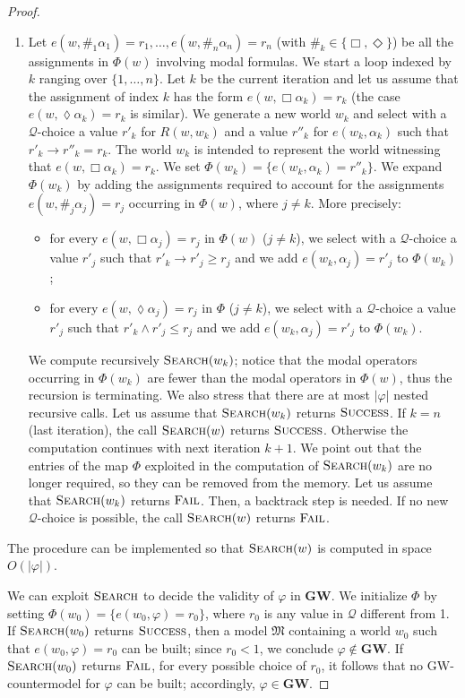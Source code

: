 \documentclass[copyright,creativecommons]{eptcs}
\newcommand{\GWL}{\mathbf{GW}}
\newcommand{\GWM}{\mbox{$\mathrm{GW}$}}
\newcommand{\Diam}{\lozenge}
\newcommand{\size}[1]{|#1|}
\newcommand{\M}{\mathfrak{M}}
\newcommand{\Search}{\textsc{Search}}
\newcommand{\Success}{\textsc{Success}}
\newcommand{\Fail}{\textsc{Fail}}
\renewcommand{\a}{\alpha}
\renewcommand{\phi}{\varphi}
\newcommand{\Qcal}{\mathcal{Q}}
\begin{document}
\begin{proof}
\begin{enumerate}[label*=(Step~\arabic*)]
\item\label{step:2} Let $e(w,\#_1\a_1)=r_1,\dots,e(w,\#_n\a_n)=r_n$
  (with $\#_k\in\{\Box,\Diamond\}$) be all the assignments in $\Phi(w)$
  involving modal formulas.  We start a loop indexed by $k$ ranging
  over $\{1,\dots,n\}$.  Let $k$ be the current iteration and let us
  assume that the assignment of index $k$ has the form
  $e(w,\Box\a_k)=r_k$ (the case $e(w,\Diam\a_k)=r_k$ is similar).  We
  generate a new world $w_k$ and select with a $\Qcal$-choice a value
  $r'_k$ for $R(w,w_k)$ and a value $r''_k$ for $e(w_k,\a_k)$ such
  that $r'_k\to r''_k = r_k$. The world $w_k$ is intended to represent
  the world witnessing that $e(w,\Box\a_k)=r_k$. We set
  $\Phi(w_k)=\{e(w_k,\a_k)=r''_k\}$.  We expand $\Phi(w_k)$ by adding
  the assignments required to account for the assignments
  $e(w,\#_j\a_j)=r_j$ occurring in $\Phi(w)$, where $j\neq k$. More
  precisely:
  \begin{itemize}
  \item for every $e(w,\Box \a_j)=r_j$ in $\Phi(w)$ ($j\neq k$), we
    select with a $\Qcal$-choice a value $r'_j$ such that $r'_k \to
    r'_j \geq r_j$ and we add $e(w_k,\a_j)=r'_j$ to $\Phi(w_k)$;
    

  \item for every $e(w,\Diam \a_j)=r_j$ in $\Phi$ ($j\neq k$), we
    select with a $\Qcal$-choice a value $r'_j$ such that $r'_k \land
    r'_j \leq r_j$ and we add $e(w_k,\a_j)=r'_j$ to $\Phi(w_k)$.
  \end{itemize}
  We compute recursively $\Search(w_k)$; notice that the modal
  operators occurring in $\Phi(w_k)$ are fewer than the modal
  operators in $\Phi(w)$, thus the recursion is terminating. We also
  stress that there are at most $\size{\phi}$ nested recursive calls.
  Let us assume that $\Search(w_k)$ returns $\Success$.  If $k=n$
  (last iteration), the call $\Search(w)$ returns $\Success$.
  Otherwise the computation continues with next iteration $k+1$.  We
  point out that the entries of the map $\Phi$ exploited in the
  computation of $\Search(w_k)$ are no longer required, so they can be
  removed from the memory.  Let us assume that $\Search(w_k)$ returns
  $\Fail$.  Then, a backtrack step is needed.  If no new
  $\Qcal$-choice is possible, the call $\Search(w)$ returns $\Fail$.
\end{enumerate}
The procedure can be implemented so that $\Search(w)$ is computed in
space $O(\size{\varphi})$.

We can exploit $\Search$ to decide the validity of $\varphi$ in
$\GWL$.  We initialize $\Phi$ by setting $\Phi(w_0)=\{e(w_0,\varphi)=
r_0\}$, where $r_0$ is any value in $\Qcal$ different from 1.  If
$\Search(w_0)$ returns $\Success$, then a model $\M$ containing a
world $w_0$ such that $e(w_0,\varphi)=r_0$ can be built; since $r_0 <
1$, we conclude $\varphi\not\in \GWL$.  If $\Search(w_0)$ returns
$\Fail$, for every possible choice of $r_0$, it follows that no
$\GWM$-countermodel for $\varphi$ can be built; accordingly,
$\varphi\in \GWL$.
\end{proof}
\end{document}
